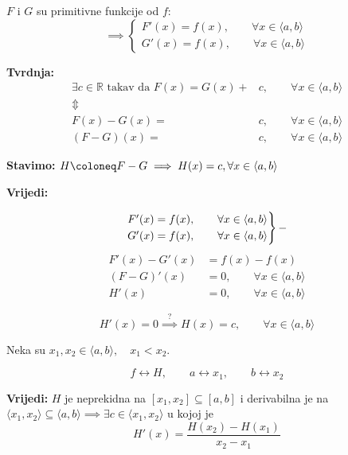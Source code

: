 \begin{multicols}{2}

\noindent
$F$ i $G$ su primitivne funkcije od $f$:
$$
\implies \begin{cases}
    F'(x) = f(x),\qquad \forall x\in\langle a,b \rangle\\
    G'(x) = f(x),\qquad \forall x\in\langle a,b \rangle
\end{cases}
$$

\noindent
\textbf{Tvrdnja:}
\begin{align*}
\exists c\in\mathbb{R}\text{ takav da }F(x) = G(x) +& c,\qquad\forall x\in \langle a,b \rangle\\
\Updownarrow\qquad&\\
F(x) - G(x) =& c,\qquad\forall x\in \langle a,b \rangle\\
(F-G)(x) =& c,\qquad\forall x\in \langle a,b \rangle
\end{align*}

\noindent
\textbf{Stavimo:} $H\coloneq F - G \implies H(x)=c,\space\forall x\in \langle a,b \rangle$

\noindent
\textbf{Vrijedi:}

$$
\begin{rcases}
    F'(x) = f(x),\qquad\forall x\in \langle a,b \rangle\\
    G'(x) = f(x),\qquad\forall x\in \langle a,b \rangle
\end{rcases} -
$$
\begin{align*}
    F'(x)-G'(x)&=f(x)-f(x)\\
    (F-G)'(x)&=0,\qquad\forall x\in \langle a,b \rangle\\
    \label{eq:h_is_zero}
    H'(x)&=0,\qquad\forall x\in \langle a,b \rangle\tag{A}
\end{align*}

$$
H'(x)=0\stackrel{?}{\implies}H(x)=c,\qquad\forall x\in \langle a,b \rangle
$$

Neka su $x_1,x_2 \in \langle a,b \rangle,\quad x_1<x_2$.

$$
f \leftrightarrow H,\qquad a\leftrightarrow x_1,\qquad b\leftrightarrow x_2
$$
\newcolumn

\noindent
\textbf{Vrijedi:} $H$ je neprekidna na $[x_1,x_2]\subseteq [a,b]$ i derivabilna
je na $\langle x_1,x_2 \rangle\subseteq\langle a,b \rangle \implies \exists c\in\langle x_1,x_2 \rangle$
u kojoj je
\begin{equation}
    \label{eq:h_is_frac}
    H'(x)=\frac{H(x_2)-H(x_1)}{x_2-x_1}\tag{B}
\end{equation}


\end{multicols}
